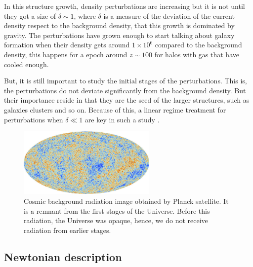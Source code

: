 In this structure growth, density perturbations are increasing but it is not
until they got a size of $\delta\sim 1$, where $\delta$ is a measure of the deviation of the 
current density respect to the background density, that this growth is dominated 
by gravity. 
The perturbations have grown enough to start talking 
about galaxy formation when their density gets around $1\times 10^6$ compared to
the background density, this happens for a epoch around $z\sim 100$ for halos with gas 
that have cooled enough.

But, it is still important to study the initial stages of the perturbations. This is,
the perturbations do not deviate significantly from the background density. But their 
importance reside in that they are the seed of the larger structures, such as galaxies
clusters and so on. 
Because of this, a linear regime treatment for perturbations when $\delta\ll 1$
are key in such a study \cite{Longair}. 

\begin{figure}[htbp]
       \centering
               \includegraphics[width=0.6\textwidth]{Images/chapter2/Planck.jpg}
       \caption{\small Cosmic background radiation image obtained by Planck satellite. \cite{planck}
It is a remnant from the first stages of the Universe. Before this radiation, the Universe was opaque, hence, we do not receive radiation from earlier stages. }
       \label{CMB}
 \end{figure}


\subsection{ Newtonian description  }


